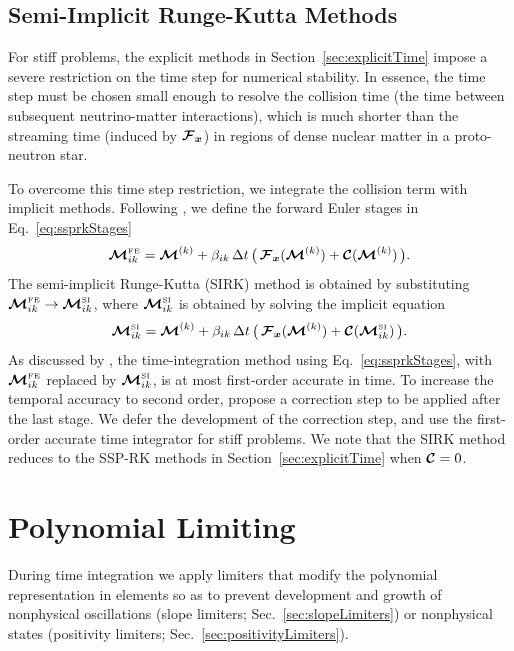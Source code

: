\documentclass[10pt,preprint]{aastex}
\begin{document}
\subsection{Semi-Implicit Runge-Kutta Methods}
\label{sec:semiImplicitTime}

For stiff problems, the explicit methods in Section~\ref{sec:explicitTime} impose a severe restriction on the time step for numerical stability.  
In essence, the time step must be chosen small enough to resolve the collision time (the time between subsequent neutrino-matter interactions), which is much shorter than the streaming time (induced by $\boldsymbol{\mathcal{F}}_{\boldsymbol{x}}$) in regions of dense nuclear matter in a proto-neutron star.  

To overcome this time step restriction, we integrate the collision term with implicit methods.  
Following \citet{chertock_etal_2015}, we define the forward Euler stages in Eq.~\eqref{eq:ssprkStages}
\begin{equation}
  \boldsymbol{\mathcal{M}}_{ik}^{\mbox{\tiny FE}}
  =\boldsymbol{\mathcal{M}}^{(k)}+\beta_{ik}\,\Delta t\,\big(\,\boldsymbol{\mathcal{F}}_{\boldsymbol{x}}(\boldsymbol{\mathcal{M}}^{(k)})+\boldsymbol{\mathcal{C}}(\boldsymbol{\mathcal{M}}^{(k)})\,\big).  
\end{equation}
The semi-implicit Runge-Kutta (SIRK) method is obtained by substituting $\boldsymbol{\mathcal{M}}_{ik}^{\mbox{\tiny FE}}\to\boldsymbol{\mathcal{M}}_{ik}^{\mbox{\tiny SI}}$, where $\boldsymbol{\mathcal{M}}_{ik}^{\mbox{\tiny SI}}$ is obtained by solving the implicit equation
\begin{equation}
  \boldsymbol{\mathcal{M}}_{ik}^{\mbox{\tiny SI}}
  =\boldsymbol{\mathcal{M}}^{(k)}+\beta_{ik}\,\Delta t\,\big(\,\boldsymbol{\mathcal{F}}_{\boldsymbol{x}}(\boldsymbol{\mathcal{M}}^{(k)})+\boldsymbol{\mathcal{C}}(\boldsymbol{\mathcal{M}}_{ik}^{\mbox{\tiny SI}})\,\big).  
\end{equation}
As discussed by \citet{chertock_etal_2015}, the time-integration method using Eq.~\eqref{eq:ssprkStages}, with $\boldsymbol{\mathcal{M}}_{ik}^{\mbox{\tiny FE}}$ replaced by $\boldsymbol{\mathcal{M}}_{ik}^{\mbox{\tiny SI}}$, is at most first-order accurate in time.  
To increase the temporal accuracy to second order, \citet{chertock_etal_2015} propose a correction step to be applied after the last stage.  
We defer the development of the correction step, and use the first-order accurate time integrator for stiff problems.  
We note that the SIRK method reduces to the SSP-RK methods in Section~\ref{sec:explicitTime} when $\boldsymbol{\mathcal{C}}=0$.  

\clearpage

\section{Polynomial Limiting}

During time integration we apply limiters that modify the polynomial representation in elements so as to prevent development and growth of nonphysical oscillations (slope limiters; Sec.~\ref{sec:slopeLimiters}) or nonphysical states (positivity limiters; Sec.~\ref{sec:positivityLimiters}).  
\end{document}

